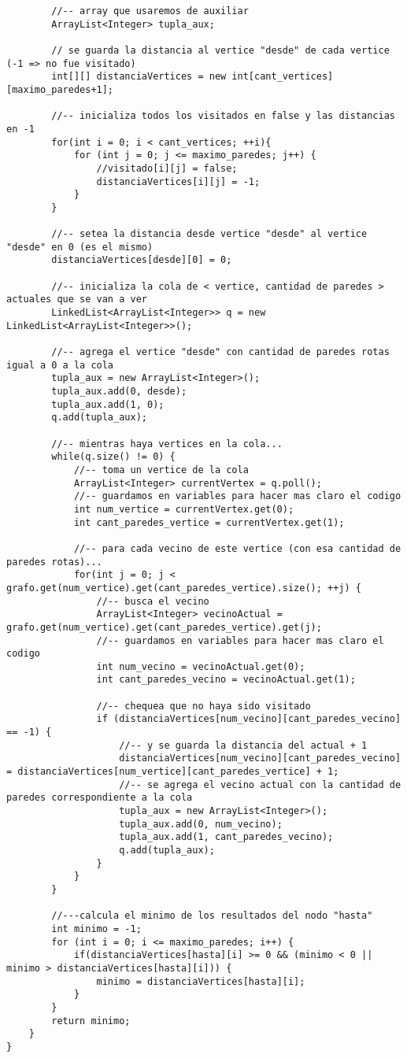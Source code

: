 \begin{lstlisting}
		//-- array que usaremos de auxiliar
		ArrayList<Integer> tupla_aux;

		// se guarda la distancia al vertice "desde" de cada vertice (-1 => no fue visitado)
		int[][] distanciaVertices = new int[cant_vertices][maximo_paredes+1];

		//-- inicializa todos los visitados en false y las distancias en -1
		for(int i = 0; i < cant_vertices; ++i){
			for (int j = 0; j <= maximo_paredes; j++) {
				//visitado[i][j] = false;
				distanciaVertices[i][j] = -1;
			}
		}

		//-- setea la distancia desde vertice "desde" al vertice "desde" en 0 (es el mismo)
		distanciaVertices[desde][0] = 0;

		//-- inicializa la cola de < vertice, cantidad de paredes > actuales que se van a ver
		LinkedList<ArrayList<Integer>> q = new LinkedList<ArrayList<Integer>>();

		//-- agrega el vertice "desde" con cantidad de paredes rotas igual a 0 a la cola
		tupla_aux = new ArrayList<Integer>();
		tupla_aux.add(0, desde);
		tupla_aux.add(1, 0);
		q.add(tupla_aux);

		//-- mientras haya vertices en la cola...
		while(q.size() != 0) {
			//-- toma un vertice de la cola
			ArrayList<Integer> currentVertex = q.poll();
			//-- guardamos en variables para hacer mas claro el codigo
			int num_vertice = currentVertex.get(0);
			int cant_paredes_vertice = currentVertex.get(1);

			//-- para cada vecino de este vertice (con esa cantidad de paredes rotas)...
			for(int j = 0; j < grafo.get(num_vertice).get(cant_paredes_vertice).size(); ++j) {
				//-- busca el vecino
				ArrayList<Integer> vecinoActual = grafo.get(num_vertice).get(cant_paredes_vertice).get(j);
				//-- guardamos en variables para hacer mas claro el codigo
				int num_vecino = vecinoActual.get(0);
				int cant_paredes_vecino = vecinoActual.get(1);

				//-- chequea que no haya sido visitado
				if (distanciaVertices[num_vecino][cant_paredes_vecino] == -1) {
					//-- y se guarda la distancia del actual + 1
					distanciaVertices[num_vecino][cant_paredes_vecino] = distanciaVertices[num_vertice][cant_paredes_vertice] + 1;
					//-- se agrega el vecino actual con la cantidad de paredes correspondiente a la cola
					tupla_aux = new ArrayList<Integer>();
					tupla_aux.add(0, num_vecino);
					tupla_aux.add(1, cant_paredes_vecino);
					q.add(tupla_aux);
				}
			}
		}

		//---calcula el minimo de los resultados del nodo "hasta"
		int minimo = -1;
		for (int i = 0; i <= maximo_paredes; i++) {
			if(distanciaVertices[hasta][i] >= 0 && (minimo < 0 || minimo > distanciaVertices[hasta][i])) {
				minimo = distanciaVertices[hasta][i];
			}
		}
		return minimo;
	}
}
	\end{lstlisting}


